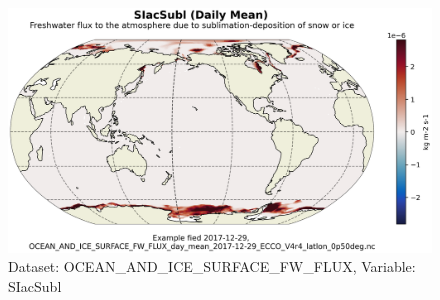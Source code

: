 \begin{figure}[H]
\centering
\includegraphics[scale=0.55]{../images/plots/latlon_plots/Ocean_and_Sea-Ice_Surface_Freshwater_Fluxes/SIacSubl.png}
\caption{Dataset: OCEAN\_AND\_ICE\_SURFACE\_FW\_FLUX, Variable: SIacSubl}
\label{tab:table-OCEAN_AND_ICE_SURFACE_FW_FLUX_SIacSubl-Plot}
\end{figure}
\pagebreak
